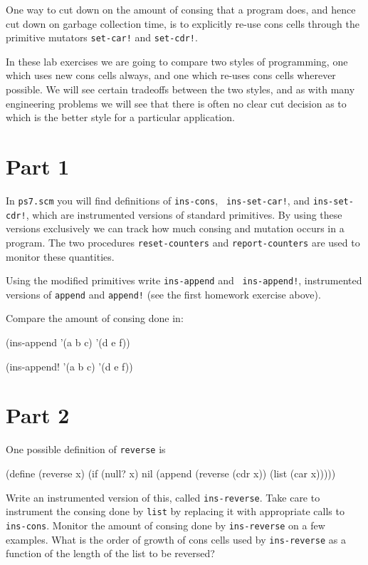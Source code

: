 One way to cut down on the amount of consing that a program does, and
hence cut down on garbage collection time, is to explicitly re-use cons
cells through the primitive mutators {\tt set-car!} and {\tt set-cdr!}.

In these lab exercises we are going to compare two styles of
programming, one which uses new cons cells always, and one which re-uses
cons cells wherever possible.  We will see certain tradeoffs between the
two styles, and as with many engineering problems we will see that there
is often no clear cut decision as to which is the better style for a
particular application.

\section{Part 1}

In {\tt ps7.scm} you will find definitions of {\tt ins-cons}, {\tt
ins-set-car!}, and {\tt ins-set-cdr!}, which are instrumented versions
of standard primitives.  By using these versions exclusively we can
track how much consing and mutation occurs in a program.  The two
procedures {\tt reset-counters} and {\tt report-counters} are used to
monitor these quantities.

Using the modified primitives write {\tt ins-append} and {\tt
ins-append!}, instrumented versions of {\tt append} and {\tt append!}
(see the first homework exercise above).

Compare the amount of consing done in:

\beginlisp
(ins-append '(a b c) '(d e f))

(ins-append! '(a b c) '(d e f))
\endlisp

\section{Part 2}

One possible definition of {\tt reverse} is

\beginlisp
(define (reverse x)
  (if (null? x)
      nil
      (append (reverse (cdr x)) (list (car x)))))
\endlisp

Write an instrumented version of this, called {\tt ins-reverse}.  Take
care to instrument the consing done by {\tt list} by replacing it with
appropriate calls to {\tt ins-cons}.  Monitor the amount of consing
done by {\tt ins-reverse} on a few examples.  What is the order of
growth of cons cells used by {\tt ins-reverse} as a function of the
length of the list to be reversed?

